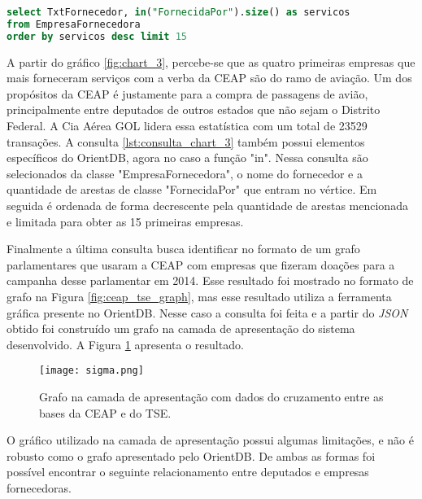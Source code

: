 \begin{lstlisting}[label={lst:consulta_chart_3}, caption={Consulta para o gráfico \ref{fig:chart_3}},captionpos=b, language=sql]
select TxtFornecedor, in("FornecidaPor").size() as servicos 
from EmpresaFornecedora 
order by servicos desc limit 15
\end{lstlisting}

A partir do gráfico \ref{fig:chart_3}, percebe-se que as quatro primeiras empresas que mais forneceram serviços com a verba da CEAP são do ramo de aviação. Um dos propósitos da CEAP é justamente para a compra de passagens de avião, principalmente entre deputados de outros estados que não sejam o Distrito Federal. A Cia Aérea GOL lidera essa estatística com um total de 23529 transações. A consulta \ref{lst:consulta_chart_3} também possui elementos específicos do OrientDB, agora no caso a função "in". Nessa consulta são selecionados da classe "EmpresaFornecedora", o nome do fornecedor e a quantidade de arestas de classe "FornecidaPor" que entram no vértice. Em seguida é ordenada de forma decrescente pela quantidade de arestas mencionada e limitada para obter as 15 primeiras empresas.

Finalmente a última consulta busca identificar no formato de um grafo parlamentares que usaram a CEAP com empresas que fizeram doações para a campanha desse parlamentar em 2014. Esse resultado foi mostrado no formato de grafo na Figura \ref{fig:ceap_tse_graph}, mas esse resultado utiliza a ferramenta gráfica presente no OrientDB. Nesse caso a consulta foi feita e a partir do \textit{JSON} obtido foi construído um grafo na camada de apresentação do sistema desenvolvido. A Figura \ref{fig:sigma} apresenta o resultado.

\begin{figure}[H]
\centering
\texttt{[image: sigma.png]}
\caption{Grafo na camada de apresentação com dados do cruzamento entre as bases da CEAP e do TSE.}
\label{fig:sigma}
\end{figure}

O gráfico utilizado na camada de apresentação possui algumas limitações, e não é robusto como o grafo apresentado pelo OrientDB. De ambas as formas foi possível encontrar o seguinte relacionamento entre deputados e empresas fornecedoras.

